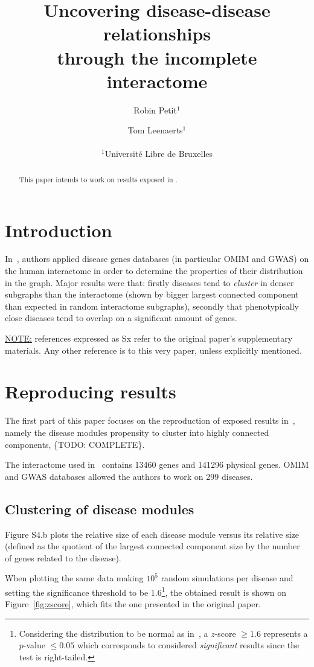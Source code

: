 \documentclass[letterpaper]{article}
\title{Uncovering disease-disease relationships\\through the incomplete interactome}
\author{Robin Petit$^{1}$ \and Tom Leenaerts$^{1}$\\
\mbox{}\\
$^1$Université Libre de Bruxelles}
\begin{document}
\maketitle

\begin{abstract}
  This paper intends to work on results exposed in \cite{originalPaper}.
\end{abstract}

\section{Introduction}

In~\cite{originalPaper}, authors applied disease genes databases (in particular OMIM and GWAS) on
the human interactome in order to determine the properties of their distribution in the graph.
Major results were that: firstly diseases tend to \textit{cluster} in denser subgraphs than the
interactome (shown by bigger largest connected component than expected in random interactome subgraphs),
secondly that phenotypically close diseases tend to overlap on a significant amount of genes.

\underline{NOTE:} references expressed as Sx refer to the original paper's supplementary materials. Any
other reference is to this very paper, unless explicitly mentioned.

\section{Reproducing results}

The first part of this paper focuses on the reproduction of exposed results in~\cite{originalPaper},
namely the disease modules propensity to cluster into highly connected components, \{TODO: COMPLETE\}.

The interactome used in~\cite{originalPaper} contains 13460 genes and 141296 physical genes. OMIM and
GWAS databases allowed the authors to work on 299 diseases.

	\subsection{Clustering of disease modules}
	Figure S4.b plots the relative size of each disease module versus its relative size (defined as the
	quotient of the largest connected component size by the number of genes related to the disease).

	When plotting the same data making $10^5$ random simulations per disease and setting the significance
	threshold to be $1.6$\footnote{Considering the distribution to be normal as in~\cite{fluctuationGiantComponent},
	a $z$-score $\geq 1.6$ represents a $p$-value $\leq 0.05$ which corresponds to considered
	\textit{significant} results since the test is right-tailed.}, the obtained result is shown on
	Figure~\ref{fig:zscore}, which fits the one presented in the original paper.
\end{document}
